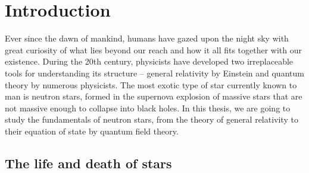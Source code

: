 \setcounter{chapter}{-1} %
\chapter{Introduction}


Ever since the dawn of mankind, humans have gazed upon the night sky with great curiosity of what lies beyond our reach and how it all fits together with our existence.
During the 20th century, physicists have developed two irreplaceable tools for understanding its structure -- general relativity by Einstein and quantum theory by numerous physicists.
The most exotic type of star currently known to man is neutron stars, formed in the supernova explosion of massive stars that are not massive enough to collapse into black holes.
In this thesis, we are going to study the fundamentals of neutron stars, from the theory of general relativity to their equation of state by quantum field theory.

\section{The life and death of stars}

